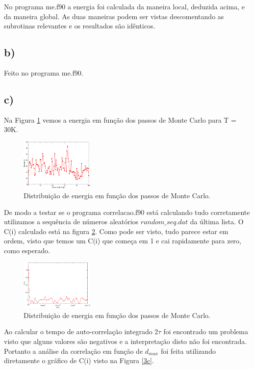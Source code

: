 \documentclass[a4wide]{report}
\begin{document}
No programa me.f90 a energia foi calculada da maneira local, deduzida acima, e da maneira global. As duas maneiras podem ser vistas descomentando as subrotinas relevantes e os resultados são idênticos.

\subsection*{b) }

Feito no programa me.f90.

\subsection*{c) }
Na Figura \ref{1c} vemos a energia em função dos passos de Monte Carlo para T = 30K.
\begin{figure}[!htb]
\centering
\includegraphics[width=0.32\textwidth]{saida.pdf}
\caption{Distribuição de energia em função dos passos de Monte Carlo.}
\label{1c}
\end{figure}

De modo a testar se o programa correlacao.f90 está calculando tudo corretamente utilizamos a sequência de números aleatórios $random\_seq.dat$ da última lista. O C(i) calculado está na figura \ref{2c}. Como pode ser visto, tudo parece estar em ordem, visto que temos um C(i) que começa em 1 e cai rapidamente para zero, como esperado.

\begin{figure}[!htb]
\centering
\includegraphics[width=0.32\textwidth]{teste.pdf}
\caption{Distribuição de energia em função dos passos de Monte Carlo.}
\label{2c}
\end{figure}


Ao calcular o tempo de auto-correlação integrado 2$\tau$ foi encontrado um problema visto que alguns valores são negativos e a interpretação disto não foi encontrada. Portanto a análise da correlação em função de $d_{max}$ foi feita utilizando diretamente o gráfico de C(i) visto na Figura \ref{3c}.
\end{document}
